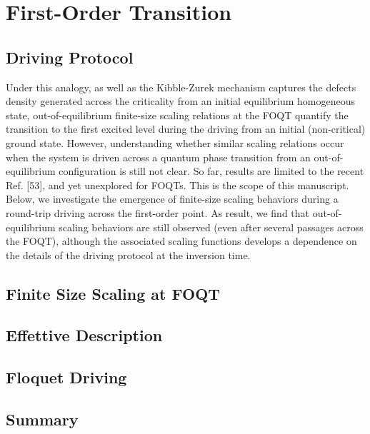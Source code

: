 \section{First-Order Transition}
\label{rtripfoqt}

\subsection{Driving Protocol}


Under this analogy, as well as the Kibble-Zurek mechanism captures the defects 
density generated across the criticality from an initial equilibrium homogeneous state,
out-of-equilibrium finite-size scaling relations at the FOQT quantify the transition to the
first excited level during the driving from an initial (non-critical) ground state.
However, understanding whether similar scaling relations occur when the system is
driven across a quantum phase transition from an out-of-equilibrium configuration is 
still not clear. So far, results are limited to the recent Ref. [53], and yet unexplored
for FOQTs. This is the scope of this manuscript. Below, we
investigate the emergence of finite-size scaling behaviors
during a round-trip driving across the first-order point. As
result, we find that out-of-equilibrium scaling behaviors
are still observed (even after several passages across the
FOQT), although the associated scaling functions develops
a dependence on the details of the driving protocol at the
inversion time.



\subsection{Finite Size Scaling at FOQT}







\subsection{Effettive Description}




\subsection{Floquet Driving}




\subsection{Summary}
